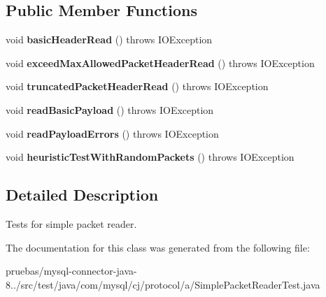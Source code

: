 \subsection*{Public Member Functions}
\begin{DoxyCompactItemize}
\item 
\mbox{\label{classcom_1_1mysql_1_1cj_1_1protocol_1_1a_1_1_simple_packet_reader_test_a1f7b37b061f0ada311d62bb5fd26bad4}} 
void {\bfseries basic\+Header\+Read} ()  throws I\+O\+Exception 
\item 
\mbox{\label{classcom_1_1mysql_1_1cj_1_1protocol_1_1a_1_1_simple_packet_reader_test_ab864f41b5c602198467dac2ee07dce27}} 
void {\bfseries exceed\+Max\+Allowed\+Packet\+Header\+Read} ()  throws I\+O\+Exception 
\item 
\mbox{\label{classcom_1_1mysql_1_1cj_1_1protocol_1_1a_1_1_simple_packet_reader_test_aeab8953b67cd52f0c1c001e4b59fd584}} 
void {\bfseries truncated\+Packet\+Header\+Read} ()  throws I\+O\+Exception 
\item 
\mbox{\label{classcom_1_1mysql_1_1cj_1_1protocol_1_1a_1_1_simple_packet_reader_test_a3b2e9100262ef54c4a6a58aed877442a}} 
void {\bfseries read\+Basic\+Payload} ()  throws I\+O\+Exception 
\item 
\mbox{\label{classcom_1_1mysql_1_1cj_1_1protocol_1_1a_1_1_simple_packet_reader_test_a71ae7e26122458c2fd135aacdfcdbf06}} 
void {\bfseries read\+Payload\+Errors} ()  throws I\+O\+Exception 
\item 
\mbox{\label{classcom_1_1mysql_1_1cj_1_1protocol_1_1a_1_1_simple_packet_reader_test_a167ef7e01235c823278cb01e05af9920}} 
void {\bfseries heuristic\+Test\+With\+Random\+Packets} ()  throws I\+O\+Exception 
\end{DoxyCompactItemize}


\subsection{Detailed Description}
Tests for simple packet reader. 

The documentation for this class was generated from the following file\+:\begin{DoxyCompactItemize}
\item 
pruebas/mysql-\/connector-\/java-\/8../src/test/java/com/mysql/cj/protocol/a/Simple\+Packet\+Reader\+Test.\+java\end{DoxyCompactItemize}
